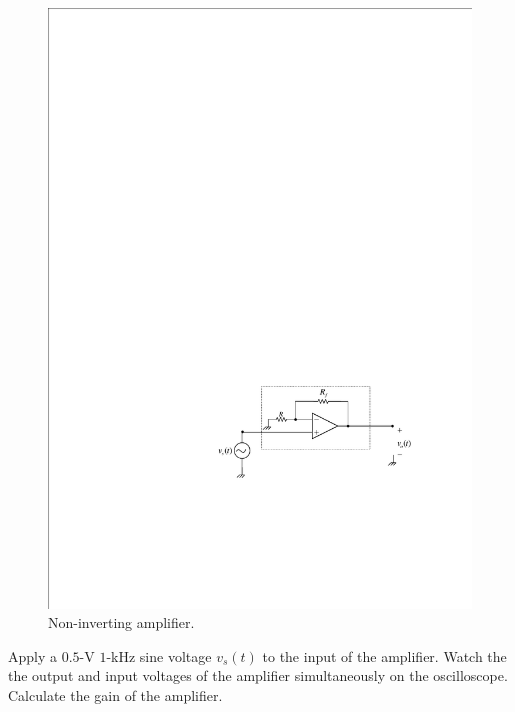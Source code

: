 \documentclass[11pt]{article}
\begin{document}
\begin{question}


\begin{figure}[H]
\centering
\includegraphics[scale=1.2,angle=0]{Fig/cir4.pdf}
\caption{Non-inverting amplifier.} \label{fig:cir4}
\end{figure}

\begin{subquestion}{Apply a $0.5$-V $1$-kHz sine voltage $v_{s}(t)$ to the input of the amplifier. Watch the the output and input voltages of the amplifier simultaneously on the oscilloscope. Calculate the gain of the amplifier.} 
\answer{}
\end{subquestion}


\end{question}
\end{document}
